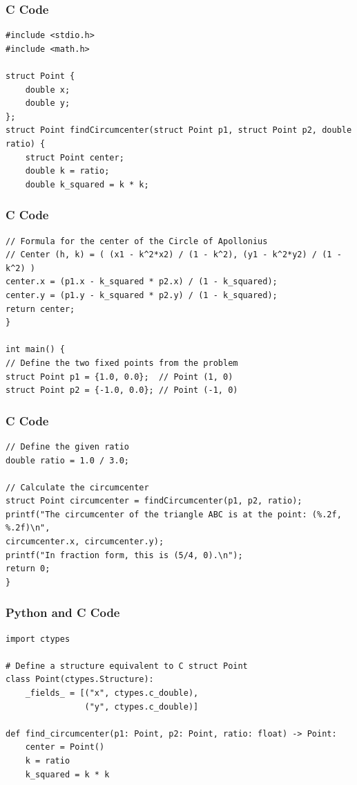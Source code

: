\documentclass{beamer}
\begin{document}
\begin{frame}[fragile]
\frametitle{C Code}
\begin{lstlisting}
#include <stdio.h>
#include <math.h>

struct Point {
    double x;
    double y;
};
struct Point findCircumcenter(struct Point p1, struct Point p2, double ratio) {
    struct Point center;
    double k = ratio;
    double k_squared = k * k;
\end{lstlisting}
\end{frame}

\begin{frame}[fragile]
\frametitle{C Code}
\begin{lstlisting}
// Formula for the center of the Circle of Apollonius
// Center (h, k) = ( (x1 - k^2*x2) / (1 - k^2), (y1 - k^2*y2) / (1 - k^2) )
center.x = (p1.x - k_squared * p2.x) / (1 - k_squared);
center.y = (p1.y - k_squared * p2.y) / (1 - k_squared);
return center;
}

int main() {
// Define the two fixed points from the problem
struct Point p1 = {1.0, 0.0};  // Point (1, 0)
struct Point p2 = {-1.0, 0.0}; // Point (-1, 0)
\end{lstlisting}
\end{frame}

\begin{frame}[fragile]
\frametitle{C Code}
\begin{lstlisting}
// Define the given ratio
double ratio = 1.0 / 3.0;

// Calculate the circumcenter
struct Point circumcenter = findCircumcenter(p1, p2, ratio);
printf("The circumcenter of the triangle ABC is at the point: (%.2f, %.2f)\n",
circumcenter.x, circumcenter.y);
printf("In fraction form, this is (5/4, 0).\n");
return 0;
}
\end{lstlisting}
\end{frame}

\begin{frame}[fragile]
\frametitle{Python and C Code}
\begin{lstlisting}
import ctypes

# Define a structure equivalent to C struct Point
class Point(ctypes.Structure):
    _fields_ = [("x", ctypes.c_double),
                ("y", ctypes.c_double)]

def find_circumcenter(p1: Point, p2: Point, ratio: float) -> Point:
    center = Point()
    k = ratio
    k_squared = k * k
\end{lstlisting}
\end{frame}
\end{document}
